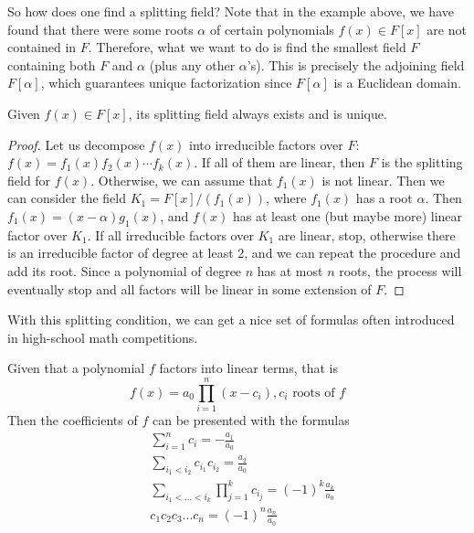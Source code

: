   So how does one find a splitting field? Note that in the example above, we have found that there were some roots $\alpha$ of certain polynomials $f(x) \in F[x]$ are not contained in $F$. Therefore, what we want to do is find the smallest field $F$ containing both $F$ and $\alpha$ (plus any other $\alpha$'s). This is precisely the adjoining field $F[\alpha]$, which guarantees unique factorization since $F[\alpha]$ is a Euclidean domain. 

  \begin{theorem}
    Given $f(x) \in F[x]$, its splitting field always exists and is unique. 
  \end{theorem}
  \begin{proof}
    Let us decompose $f(x)$ into irreducible factors over $F$: $f(x) = f_1(x)f_2(x)\cdots f_k(x)$. If all of them are linear, then $F$ is the splitting field for $f(x)$. Otherwise, we can assume that $f_1(x)$ is not linear. Then we can consider the field $K_1 = F[x]/(f_1(x))$, where $f_1(x)$ has a root $\alpha$. Then $f_1(x) = (x - \alpha)g_1(x)$, and $f(x)$ has at least one (but maybe more) linear factor over $K_1$. If all irreducible factors over $K_1$ are linear, stop, otherwise there is an irreducible factor of degree at least 2, and we can repeat the procedure and add its root. Since a polynomial of degree $n$ has at most $n$ roots, the process will eventually stop and all factors will be linear in some extension of $F$.
  \end{proof} 

  With this splitting condition, we can get a nice set of formulas often introduced in high-school math competitions. 

  \begin{theorem}
    Given that a polynomial $f$ factors into linear terms, that is 
    \begin{equation}
      f(x) = a_0 \prod_{i = 1}^{n} (x - c_i), c_i \text{ roots of } f
    \end{equation}
    Then the coefficients of $f$ can be presented with the formulas
    \begin{align*}
      & \sum_{i=1}^n c_i = - \frac{a_1}{a_0} \\
      & \sum_{i_1 < i_2} c_{i_1} c_{i_2} = \frac{a_2}{a_0} \\
      & \sum_{i_1< ...< i_k} \prod_{j = 1}^{k} c_{i_j} = (-1)^k \frac{a_k}{a_0} \\
      & c_1 c_2 c_3 ... c_n = (-1)^n \frac{a_n}{a_0}
    \end{align*}
  \end{theorem}


